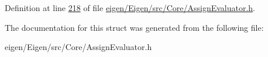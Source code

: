 Definition at line \hyperlink{eigen_2_eigen_2src_2_core_2_assign_evaluator_8h_source_l00218}{218} of file \hyperlink{eigen_2_eigen_2src_2_core_2_assign_evaluator_8h_source}{eigen/\+Eigen/src/\+Core/\+Assign\+Evaluator.\+h}.



The documentation for this struct was generated from the following file\+:\begin{DoxyCompactItemize}
\item 
eigen/\+Eigen/src/\+Core/\+Assign\+Evaluator.\+h\end{DoxyCompactItemize}
